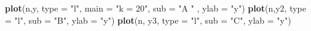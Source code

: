\documentclass[
]{article}
\newenvironment{Shaded}{\begin{snugshade}}{\end{snugshade}}
\newcommand{\DataTypeTok}[1]{\textcolor[rgb]{0.13,0.29,0.53}{#1}}
\newcommand{\KeywordTok}[1]{\textcolor[rgb]{0.13,0.29,0.53}{\textbf{#1}}}
\newcommand{\NormalTok}[1]{#1}
\newcommand{\StringTok}[1]{\textcolor[rgb]{0.31,0.60,0.02}{#1}}
\begin{document}
\begin{Shaded}
\begin{Highlighting}[]
\KeywordTok{plot}\NormalTok{(n,y, }\DataTypeTok{type =} \StringTok{"l"}\NormalTok{, }\DataTypeTok{main =} \StringTok{"k = 20"}\NormalTok{, }\DataTypeTok{sub =}  \StringTok{"A  "}\NormalTok{ , }\DataTypeTok{ylab =} \StringTok{"y"}\NormalTok{)}
\KeywordTok{plot}\NormalTok{(n,y2, }\DataTypeTok{type =} \StringTok{"l"}\NormalTok{, }\DataTypeTok{sub =} \StringTok{"B"}\NormalTok{, }\DataTypeTok{ylab =} \StringTok{"y"}\NormalTok{)}
\KeywordTok{plot}\NormalTok{(n, y3, }\DataTypeTok{type =} \StringTok{"l"}\NormalTok{, }\DataTypeTok{sub =} \StringTok{"C"}\NormalTok{, }\DataTypeTok{ylab =} \StringTok{"y"}\NormalTok{)}
\end{Highlighting}
\end{Shaded}
\end{document}
